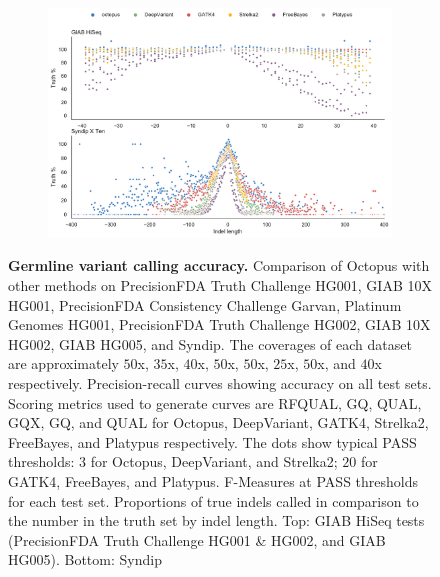 \documentclass[notitlepage, twocolumn]{article}
\begin{document}
\begin{figure}[ht!]
\begin{subfigure}[b]{0.49\textwidth}
        \includegraphics[width=\textwidth]{figures/indels}
        \label{fig:germline:indels}
    \end{subfigure}
    \vspace{-0.5cm}
    \caption{\textbf{Germline variant calling accuracy.} Comparison of Octopus with other methods on PrecisionFDA Truth Challenge HG001, GIAB 10X HG001, PrecisionFDA Consistency Challenge Garvan, Platinum Genomes HG001, PrecisionFDA Truth Challenge HG002, GIAB 10X HG002, GIAB HG005, and Syndip. The coverages of each dataset are approximately $50$x, $35$x, $40$x, $50$x, $50$x, $25$x, $50$x, and $40$x respectively. \protect{} Precision-recall curves showing accuracy on all test sets. Scoring metrics used to generate curves are RFQUAL, GQ, QUAL, GQX, GQ, and QUAL for Octopus, DeepVariant, GATK4, Strelka2, FreeBayes, and Platypus respectively. The dots show typical PASS thresholds: $3$ for Octopus, DeepVariant, and Strelka2; $20$ for GATK4, FreeBayes, and Platypus. \protect{} F-Measures at PASS thresholds for each test set. \protect{} Proportions of true indels called in comparison to the number in the truth set by indel length. Top: GIAB HiSeq tests (PrecisionFDA Truth Challenge HG001 \& HG002, and GIAB HG005). Bottom: Syndip}
    \label{fig:germline}
\end{figure}
\end{document}
